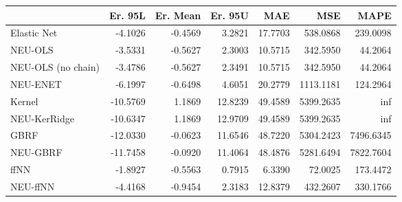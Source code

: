 \begin{tabular}{lrrrrrr}
\toprule
{} &  Er. 95L &  Er. Mean &  Er. 95U &     MAE &       MSE &      MAPE \\
\midrule
Elastic Net        &  -4.1026 &   -0.4569 &   3.2821 & 17.7703 &  538.0868 &  239.0098 \\
NEU-OLS            &  -3.5331 &   -0.5627 &   2.3003 & 10.5715 &  342.5950 &   44.2064 \\
NEU-OLS (no chain) &  -3.4786 &   -0.5627 &   2.3491 & 10.5715 &  342.5950 &   44.2064 \\
NEU-ENET           &  -6.1997 &   -0.6498 &   4.6051 & 20.2779 & 1113.1181 &  124.2964 \\
Kernel             & -10.5769 &    1.1869 &  12.8239 & 49.4589 & 5399.2635 &       inf \\
NEU-KerRidge       & -10.6347 &    1.1869 &  12.9709 & 49.4589 & 5399.2635 &       inf \\
GBRF               & -12.0330 &   -0.0623 &  11.6546 & 48.7220 & 5304.2423 & 7496.6345 \\
NEU-GBRF           & -11.7458 &   -0.0920 &  11.4064 & 48.4876 & 5281.6494 & 7822.7604 \\
ffNN               &  -1.8927 &   -0.5563 &   0.7915 &  6.3390 &   72.0025 &  173.4472 \\
NEU-ffNN           &  -4.4168 &   -0.9454 &   2.3183 & 12.8379 &  432.2607 &  330.1766 \\
\bottomrule
\end{tabular}
